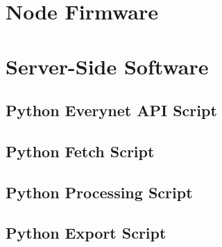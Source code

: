 \documentclass[a4paper]{report}
\begin{document}



\appendix
\chapter{Node Firmware} \label{ap:nodefirmware}

\chapter{Server-Side Software}
  \section{Python Everynet API Script} \label{ap:servereverynet}
  \section{Python Fetch Script} \label{ap:serverfetch}
  \section{Python Processing Script} \label{ap:serverprocess}
  \section{Python Export Script} \label{ap:serverexport}
\end{document}
